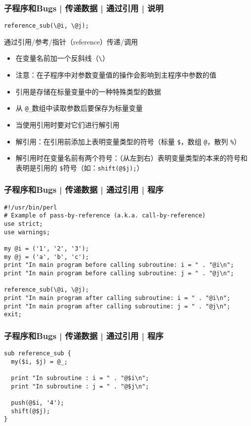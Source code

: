 \begin{frame}[fragile]
  \frametitle{子程序和Bugs | 传递数据 | 通过引用 | \alert{说明}}
\begin{lstlisting}
reference_sub(\@i, \@j);
\end{lstlisting}
\begin{block}{通过引用/参考/指针（reference）传递/调用}
  \begin{itemize}
    \item 在变量名前加一个反斜线（\verb|\|）
    \item 注意：在子程序中对参数变量值的操作会影响到主程序中参数的值
    \item 引用是存储在标量变量中的一种特殊类型的数据
    \item 从 \verb|@_|数组中读取参数后要保存为标量变量
    \item 当使用引用时要对它们进行解引用
    \item 解引用：在引用前添加上表明变量类型的符号（标量 \verb|$|，数组 \verb|@|，散列 \verb|%|）
    \item 解引用时在变量名前有两个符号：（从左到右）表明变量类型的本来的符号和表明是引用的 \verb|$|符号（如：\verb|shift(@$j);|）
  \end{itemize}
\end{block}
\end{frame}

\begin{frame}[fragile]
  \frametitle{子程序和Bugs | 传递数据 | 通过引用 | 程序}
\begin{lstlisting}[basicstyle=\footnotesize\tt]
#!/usr/bin/perl
# Example of pass-by-reference (a.k.a. call-by-reference)
use strict;
use warnings;

my @i = ('1', '2', '3');
my @j = ('a', 'b', 'c');
print "In main program before calling subroutine: i = " . "@i\n";
print "In main program before calling subroutine: j = " . "@j\n";

reference_sub(\@i, \@j);
print "In main program after calling subroutine: i = " . "@i\n";
print "In main program after calling subroutine: j = " . "@j\n";
exit;
\end{lstlisting}
\end{frame}

\begin{frame}[fragile]
  \frametitle{子程序和Bugs | 传递数据 | 通过引用 | 程序}
\begin{lstlisting}
sub reference_sub {
  my($i, $j) = @_;

  print "In subroutine : i = " . "@$i\n";
  print "In subroutine : j = " . "@$j\n";

  push(@$i, '4');
  shift(@$j);
}
\end{lstlisting}
\end{frame}

